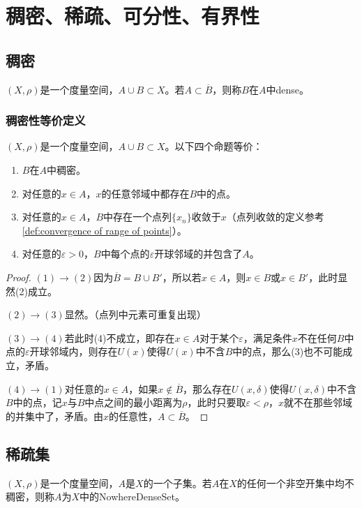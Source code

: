 \section{稠密、稀疏、可分性、有界性}
\subsection{稠密}
\begin{definition}
	$(X,\rho)$是一个度量空间，$A\cup B\subset X$。若$A\subset\overline{B}$，则称$B$在$A$中\gls{dense}。
\end{definition}
\subsubsection{稠密性等价定义}
\begin{theorem}
	$(X,\rho)$是一个度量空间，$A\cup B\subset X$。以下四个命题等价：
	\begin{enumerate}
		\item $B$在$A$中稠密。
		\item 对任意的$ x\in A$，$x$的任意邻域中都存在$B$中的点。
		\item 对任意的$ x\in A$，$B$中存在一个点列$\{x_n\}$收敛于$x$（点列收敛的定义参考\cref{def:convergence of range of points}）。
		\item 对任意的$\varepsilon>0$，$B$中每个点的$\varepsilon$开球邻域的并包含了$A$。
	\end{enumerate}
\end{theorem}
\begin{proof}
	$(1)\to(2)$因为$\overline{B}=B\cup B'$，所以若$x\in A$，则$x\in B$或$x\in B'$，此时显然(2)成立。\par
	$(2)\to(3)$显然。（点列中元素可重复出现）\par
	$(3)\to(4)$若此时(4)不成立，即存在$x\in A$对于某个$\varepsilon$，满足条件$x$不在任何$B$中点的$\varepsilon$开球邻域内，则存在$U(x)$使得$U(x)$中不含$B$中的点，那么(3)也不可能成立，矛盾。\par
	$(4)\to(1)$对任意的$ x\in A$，如果$x\notin \overline{B}$，那么存在$U(x,\delta)$使得$U(x,\delta)$中不含$B$中的点，记$x$与$B$中点之间的最小距离为$\rho$，此时只要取$\varepsilon<\rho$，$x$就不在那些邻域的并集中了，矛盾。由$x$的任意性，$A\subset\overline{B}$。
\end{proof}
\subsection{稀疏集}
\begin{definition}
	$(X,\rho)$是一个度量空间，$A$是$X$的一个子集。若$A$在$X$的任何一个非空开集中均不稠密，则称$A$为$X$中的\gls{NowhereDenseSet}。
\end{definition}
